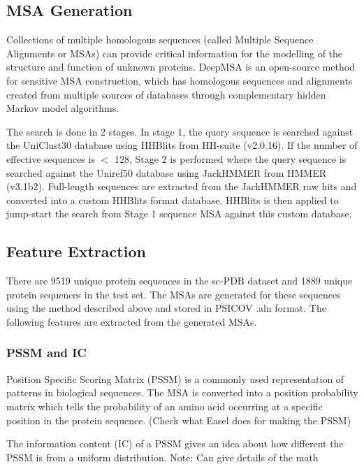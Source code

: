 \documentclass[journal=jacsat,manuscript=article]{achemso}
\begin{document}
\subsection{MSA Generation}
\quad Collections of multiple homologous sequences (called Multiple Sequence Alignments or MSAs) can provide critical information for the modelling of the structure and function of unknown proteins. DeepMSA \cite{zhang2020deepmsa} is an open-source method for sensitive MSA construction, which has homologous sequences and alignments created from multiple sources of databases through complementary hidden Markov model algorithms.

The search is done in 2 stages. In stage 1, the query sequence is searched against the UniClust30 \cite{mirdita2017uniclust} database using HHBlits from HH-suite\cite{remmert2012hhblits} (v2.0.16). If the number of effective sequences is $<$ 128, Stage 2 is performed where the query sequence is searched against the Uniref50 \cite{suzek2015uniref} database using JackHMMER from HMMER \cite{johnson2010hidden} (v3.1b2). Full-length sequences are extracted from the JackHMMER raw hits and converted into a custom HHBlits format database. HHBlits is then applied to jump-start the search from Stage 1 sequence MSA against this custom database.


\subsection{Feature Extraction}
\quad There are 9519 unique protein sequences in the sc-PDB dataset and 1889 unique protein sequences in the test set. The MSAs are generated for these sequences using the method described above and stored in PSICOV \cite{jones2012psicov} .aln format. The following features are extracted from the generated MSAs.

\subsubsection{PSSM and IC}
\quad Position Specific Scoring Matrix (PSSM) is a commonly used representation of patterns in biological sequences. The MSA is converted into a position probability matrix which tells the probability of an amino acid occurring at a specific position in the protein sequence. (Check what Easel does for making the PSSM)

The information content (IC) of a PSSM gives an idea about how different the PSSM is from a uniform distribution.
Note: Can give details of the math
\end{document}

